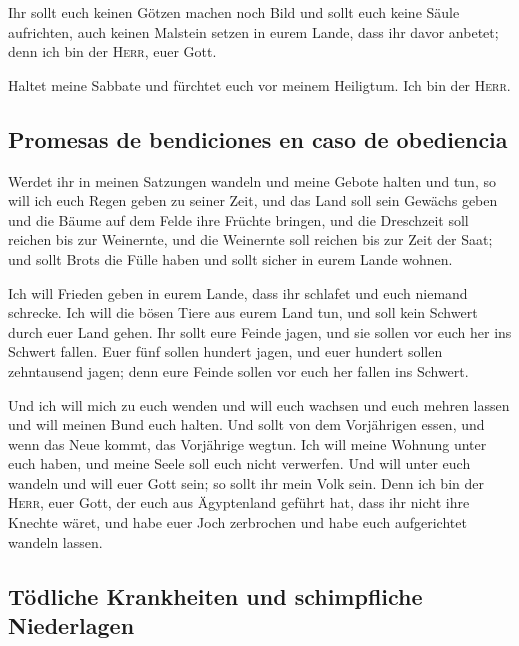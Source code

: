  Ihr sollt euch keinen Götzen machen noch Bild und sollt
euch keine Säule aufrichten, auch keinen Malstein setzen in eurem Lande,
dass ihr davor anbetet; denn ich bin der \textsc{Herr}, euer Gott.

 Haltet meine Sabbate und fürchtet euch vor meinem
Heiligtum. Ich bin der \textsc{Herr}.

\hypertarget{promesas-de-bendiciones-en-caso-de-obediencia}{%
\subsection{Promesas de bendiciones en caso de
obediencia}\label{promesas-de-bendiciones-en-caso-de-obediencia}}

 Werdet ihr in meinen Satzungen wandeln und meine Gebote
halten und tun,  so will ich euch Regen geben zu seiner
Zeit, und das Land soll sein Gewächs geben und die Bäume auf dem Felde
ihre Früchte bringen,  und die Dreschzeit soll reichen bis
zur Weinernte, und die Weinernte soll reichen bis zur Zeit der Saat; und
sollt Brots die Fülle haben und sollt sicher in eurem Lande wohnen.

 Ich will Frieden geben in eurem Lande, dass ihr schlafet
und euch niemand schrecke. Ich will die bösen Tiere aus eurem Land tun,
und soll kein Schwert durch euer Land gehen.  Ihr sollt
eure Feinde jagen, und sie sollen vor euch her ins Schwert fallen.
 Euer fünf sollen hundert jagen, und euer hundert sollen
zehntausend jagen; denn eure Feinde sollen vor euch her fallen ins
Schwert.

 Und ich will mich zu euch wenden und will euch wachsen
und euch mehren lassen und will meinen Bund euch halten. 
Und sollt von dem Vorjährigen essen, und wenn das Neue kommt, das
Vorjährige wegtun.  Ich will meine Wohnung unter euch
haben, und meine Seele soll euch nicht verwerfen.  Und
will unter euch wandeln und will euer Gott sein; so sollt ihr mein Volk
sein.  Denn ich bin der \textsc{Herr}, euer Gott, der
euch aus Ägyptenland geführt hat, dass ihr nicht ihre Knechte wäret, und
habe euer Joch zerbrochen und habe euch aufgerichtet wandeln lassen.

\hypertarget{tuxf6dliche-krankheiten-und-schimpfliche-niederlagen}{%
\subsection{Tödliche Krankheiten und schimpfliche
Niederlagen}\label{tuxf6dliche-krankheiten-und-schimpfliche-niederlagen}}

